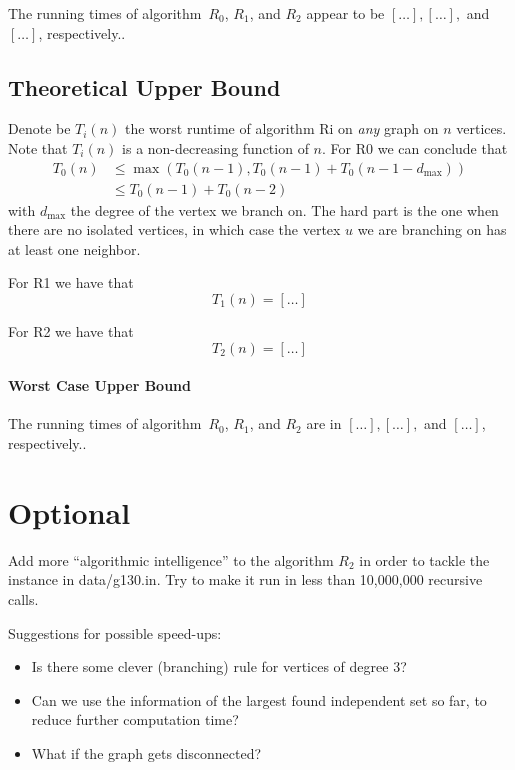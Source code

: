 \documentclass{tufte-handout}
\begin{document}
The running times of algorithm~$R_0$, $R_1$, and $R_2$ appear to be
$[\ldots],[\ldots],$ and $[\ldots]$, respectively..

\subsection{Theoretical Upper Bound}

Denote be $T_i(n)$ the worst runtime of algorithm Ri on \emph{any} graph on $n$ vertices.
Note that $T_i(n)$ is a non-decreasing function of $n$.
For R0 we can conclude that
\begin{align*}
T_0(n) &\leq\max(T_0(n-1), T_0(n-1)+T_0(n-1-d_{\mbox{max}})) \\ &\leq T_0(n-1)+T_0(n-2)
\end{align*}
with $d_{\mbox{max}}$ the degree of the vertex we branch on. The hard part is the one when there are no isolated vertices, in which case the vertex $u$ we are branching on has at least one neighbor. 

For R1 we have that
 \[
 T_1(n)=[\ldots]
 \]

For R2 we have that
 \[
 T_2(n)=[\ldots]
 \]
\paragraph{Worst Case Upper Bound}
The running times of algorithm~$R_0$, $R_1$, and $R_2$ are in
$[\ldots],[\ldots],$ and $[\ldots]$, respectively.. \newpage

\section{Optional}
Add more ``algorithmic intelligence'' to the algorithm $R_2$ in order to tackle the instance in data/g130.in.
Try to make it run in less than 10,000,000 recursive calls. 

Suggestions for possible speed-ups:
\begin{itemize}
\item Is there some clever (branching) rule for vertices of degree 3?
\item Can we use the information of the largest found independent set so far, to reduce further computation time?
\item What if the graph gets disconnected?
\end{itemize}
\end{document}

